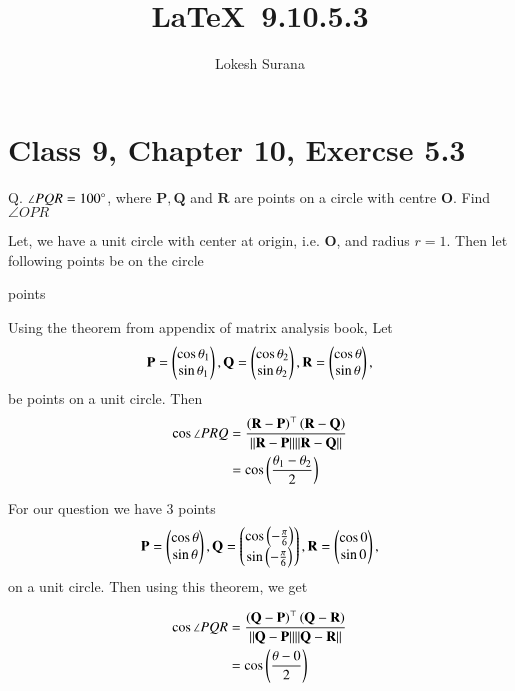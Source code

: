 \documentclass[journal,12pt,twocolumn]{IEEEtran}
\let\vec\mathbf
\begin{document}
\vspace{3cm}
\title{\LaTeX\ 9.10.5.3}
\author{Lokesh Surana}
\maketitle
\section*{Class 9, Chapter 10, Exercse 5.3}

Q. $\angle{PQR} = 100\degree$, where $\vec{P}, \vec{Q}$ and $\vec{R}$ are points on a circle with centre $\vec{O}$. Find $\angle{OPR}$

\solution
Let, we have a unit circle with center at origin, i.e. $\vec{O}$, and radius $r = 1$.
Then let following points be on the circle

\begin{table}[ht!]
    
    \caption{points}
    \label{tab:points}
\end{table}

Using the theorem from appendix of matrix analysis book,
Let 
\begin{align}
\vec{P} =  \myvec{\cos \theta_1 \\ \sin \theta_1},
\vec{Q} =  \myvec{\cos \theta_2 \\ \sin \theta_2},
\vec{R} =  \myvec{\cos \theta \\ \sin \theta},
\end{align}
 be points on  a unit circle. Then
\begin{align}
  \cos\angle{PRQ} &= \frac{\brak{\vec{R}-\vec{P}}^{\top} \brak{\vec{R}-\vec{Q}}}{\norm{\vec{R}-\vec{P}}\norm{\vec{R}-\vec{Q}}}
  \\
  &= \cos \brak{\frac{\theta_1 - \theta_2}{2}}
\end{align}


For our question we have 3 points
\begin{align}
    \vec{P} =  \myvec{\cos \theta   \\ \sin \theta},
    \vec{Q} =  \myvec{\cos \brak{-\frac{\pi}{6}} \\ \sin \brak{-\frac{\pi}{6}}},
    \vec{R} =  \myvec{\cos 0 \\ \sin 0},
\end{align}
on a unit circle. Then using this theorem, we get

\begin{align}
    \label{eq:1} \cos\angle{PQR} & = \frac{\brak{\vec{Q}-\vec{P}}^{\top} \brak{\vec{Q}-\vec{R}}}{\norm{\vec{Q}-\vec{P}}\norm{\vec{Q}-\vec{R}}}\\
    & = \cos \brak{\frac{\theta - 0}{2}}
\end{align}
\end{document}
